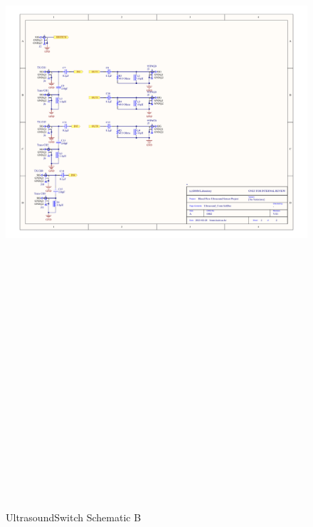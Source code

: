 \begin{landscape}
	\begin{figure}[htbp]
		\centering
		\includegraphics[width=20cm,height=28.7cm,keepaspectratio]{Figures/appendix/ultrasound_conn.pdf}
		\caption{UltrasoundSwitch Schematic B}
		\label{fig:appendix_ultrasoundswitch_b}
	\end{figure}
\end{landscape}
